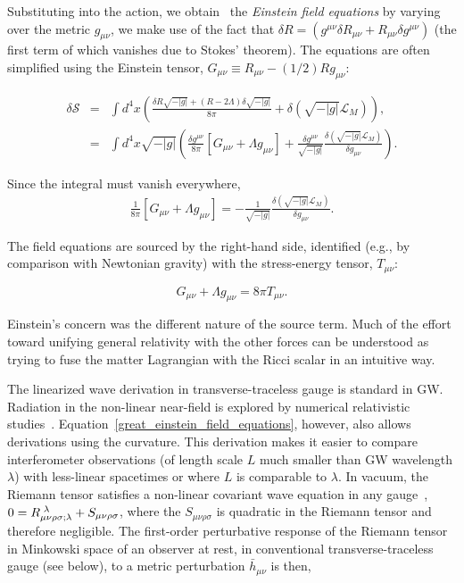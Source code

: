 Substituting into the action, we obtain~\cite{Carroll1997} the \textit{Einstein field equations} by varying over the metric $g_{\mu\nu}$, we make use of the fact that $\delta R = (g^{\mu\nu} \delta R_{\mu\nu} + R_{\mu\nu} \delta g^{\mu\nu})$ (the first term of which vanishes due to Stokes' theorem).
The equations are often simplified using the Einstein tensor, $G_{\mu\nu} \equiv R_{\mu\nu} - (1/2)R g_{\mu\nu}$:

\begin{eqnarray}
\delta \mathcal{S} &=& \int d^4 x \left( \frac{\delta R \sqrt{-|g|} + (R-2\Lambda)\delta \sqrt{-|g|}}{8\pi}+ \delta (\sqrt{-|g|}\mathcal{L}_M)\right), \\
 &=& \int d^4 x \sqrt{-|g|}\left( \frac{\delta g^{\mu\nu}}{8\pi} \left[ G_{\mu\nu} + \Lambda g_{\mu\nu} \right]
 + \frac{\delta g^{\mu \nu}}{\sqrt{-|g|}} \frac{\delta (\sqrt{-|g|}\mathcal{L}_M)}{\delta g_{\mu\nu}} \right).
\end{eqnarray}

\noindent Since the integral must vanish everywhere,
\begin{eqnarray}
\frac{1}{8\pi} \left[G_{\mu\nu} + \Lambda g_{\mu\nu} \right] = -\frac{1}{\sqrt{-|g|}}\frac{\delta (\sqrt{-|g|}\mathcal{L}_M)}{\delta g_{\mu\nu}}.
\end{eqnarray}

\noindent The field equations are sourced by the right-hand side, identified (e.g., by comparison with Newtonian gravity) with the stress-energy tensor, $T_{\mu\nu}$:

\begin{equation}
G_{\mu\nu} + \Lambda g_{\mu\nu} = 8 \pi T_{\mu\nu}.
\label{great_einstein_field_equations}
\end{equation}

Einstein's concern was the different nature of the source term.
Much of the effort toward unifying general relativity with the other forces can be understood as trying to fuse the matter Lagrangian with the Ricci scalar in an intuitive way.

The linearized wave derivation in transverse-traceless gauge is standard in GW. 
Radiation in the non-linear near-field is explored by numerical relativistic studies~\cite{FarrThesis}.
Equation~\ref{great_einstein_field_equations}, however, also allows derivations using the curvature.
This derivation makes it easier to compare interferometer observations (of length scale $L$ much smaller than GW wavelength $\lambda$) with less-linear spacetimes or where $L$ is comparable to $\lambda$.
In vacuum, the Riemann tensor satisfies a non-linear covariant wave equation in any gauge~\cite{KoopFinn2014}, $0 = R_{\mu \nu \rho \sigma; \lambda}^{\textup{        } \lambda} + S_{\mu \nu \rho \sigma}$, where the $S_{\mu \nu \rho \sigma}$ is quadratic in the Riemann tensor and therefore negligible.
The first-order perturbative response of the Riemann tensor in Minkowski space of an observer at rest, in conventional transverse-traceless gauge (see below), to a metric perturbation $\bar{h}_{\mu\nu}$ is then,

